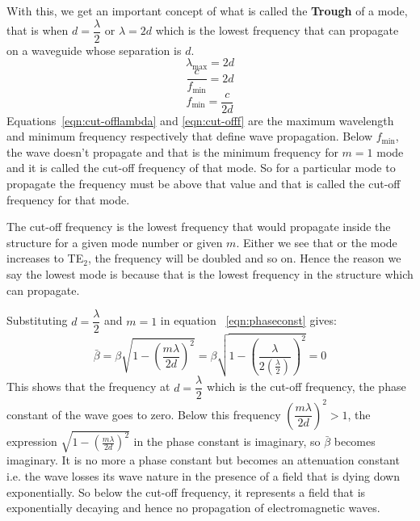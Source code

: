 With this, we get an important concept of what is called the \textbf{Trough} of a mode, that is when $d = \dfrac{\lambda}{2}$ or $\lambda = 2d$ which is the lowest frequency that can propagate on a waveguide whose separation is $d$.
\begin{dmath}
\lambda_\max = 2d
\label{eqn:cut-offlambda}
\end{dmath}
\begin{dmath*}
\frac{c}{f_\min} = 2d
\end{dmath*}
\begin{dmath}
f_\min = \frac{c}{2d}
\label{eqn:cut-offf}
\end{dmath}
Equations~\ref{eqn:cut-offlambda} and \ref{eqn:cut-offf} are the maximum wavelength and minimum frequency respectively that define wave propagation. Below $f_\min$, the wave doesn't propagate and that is the minimum frequency for $m=1$ mode and it is called the cut-off frequency of that mode. So for a particular mode to propagate the frequency must be above that value and that is called the cut-off frequency for that mode.

The cut-off frequency is the lowest frequency that would propagate inside the structure for a given mode number or given $m$. Either we see that or the mode increases to TE$_2$, the frequency will be doubled and so on. Hence the reason we say the lowest mode is because that is the lowest frequency in the structure which can propagate.

Substituting $d=\dfrac{\lambda}{2}$ and $m=1$ in equation ~\ref{eqn:phaseconst} gives:
\begin{dmath*}
\bar{\beta} = \beta\sqrt{1 - \left(\frac{m\lambda}{2d}\right)^2} =  \beta\sqrt{1 - \left(\frac{\lambda}{2\left(\frac{\lambda}{2}\right)}\right)^2} = 0
\end{dmath*}
This shows that the frequency at $d=\dfrac{\lambda}{2}$ which is the cut-off frequency, the phase constant of the wave goes to zero. Below this frequency $\left(\dfrac{m\lambda}{2d}\right)^2 > 1$, the expression $\sqrt{1 - \left(\frac{m\lambda}{2d}\right)^2}$ in the phase constant is imaginary, so $\bar{\beta}$ becomes imaginary. It is no more a phase constant but becomes an attenuation constant i.e. the wave losses its wave nature in the presence of a field that is dying down exponentially. So below the cut-off frequency, it represents a field that is exponentially decaying and hence no propagation of electromagnetic waves.

